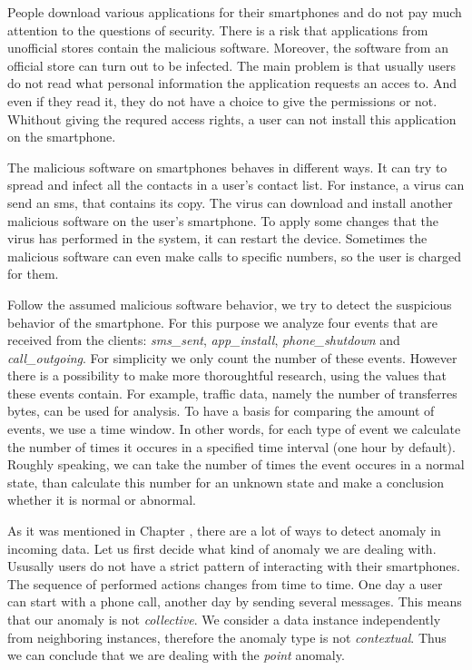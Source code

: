 
People download various applications for their smartphones and do not pay much attention to the questions of security.
There is a risk that applications from unofficial stores contain the malicious software.
Moreover, the software from an official store can turn out to be infected.
The main problem is that usually users do not read what personal information the application requests an acces to.
And even if they read it, they do not have a choice to give the permissions or not.
Whithout giving the requred access rights, a user can not install this application on the smartphone.
   
The malicious software on smartphones behaves in different ways.
It can try to spread and infect all the contacts in a user's contact list.
For instance, a virus can send an sms, that contains its copy.
The virus can download and install another malicious software on the user's smartphone.
To apply some changes that the virus has performed in the system, it can restart the device.
Sometimes the malicious software can even make calls to specific numbers, so the user is charged for them.

Follow the assumed malicious software behavior, we try to detect the suspicious behavior of the smartphone.
For this purpose we analyze four events that are received from the clients: \textit{sms\_sent}, \textit{app\_install}, \textit{phone\_shutdown} and \textit{call\_outgoing}.
For simplicity we only count the number of these events.
However there is a possibility to make more thoroughtful research, using the values that these events contain.
For example, traffic data, namely the number of transferres bytes, can be used for analysis.
To have a basis for comparing the amount of events, we use a time window.
In other words, for each type of event we calculate the number of times it occures in a specified time interval (one hour by default).
Roughly speaking, we can take the number of times the event occures in a normal state, than calculate this number for an unknown state and make a conclusion whether it is normal or abnormal.   

As it was mentioned in Chapter , there are a lot of ways to detect anomaly in incoming data.
Let us first decide what kind of anomaly we are dealing with.
Ususally users do not have a strict pattern of interacting with their smartphones.
The sequence of performed actions changes from time to time.
One day a user can start with a phone call, another day by sending several messages.
This means that our anomaly is not \textit{collective}.
We consider a data instance independently from neighboring instances, therefore the anomaly type is not \textit{contextual}.
Thus we can conclude that we are dealing with the \textit{point} anomaly.

